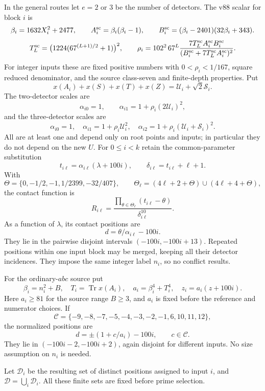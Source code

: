 \documentclass[11pt]{article}
\newcommand{\Tr}{\operatorname{Tr}}
\begin{document}
In the general routes let \(e=2\) or \(3\) be the number of
detectors. The v88 scalar for block \(i\) is
\[
 \beta_i=1632X_i^2+2477,\qquad
 A_i^{\rm sc}=\beta_i(\beta_i-1),\qquad
 B_i^{\rm sc}=(\beta_i-2401)(32\beta_i+343).
\]
\[
 T_L^{\rm sc}=\bigl(1224(67^{(L+1)/2}+1)\bigr)^2,\qquad
 \rho_i=102^2\,67^L
 \frac{7T_L^{\rm sc}A_i^{\rm sc}B_i^{\rm sc}}
 {(B_i^{\rm sc}+7T_L^{\rm sc}A_i^{\rm sc})^2}.
\]
For integer inputs these are fixed positive numbers with
\(0<\rho_i<1/167\), square reduced denominator, and the source
class-seven and finite-depth properties. Put
\[
 x(A_i)+x(S)+x(T)+x(Z)=\mathcal U_i+\sqrt2\mathcal S_i.
\]
The two-detector scales are
\[
           \alpha_{i0}=1,\qquad
           \alpha_{i1}=1+\rho_i(2\mathcal U_i)^2 ,
\]
and the three-detector scales are
\[
 \alpha_{i0}=1,\quad
 \alpha_{i1}=1+\rho_i\mathcal U_i^2,\quad
 \alpha_{i2}=1+\rho_i(\mathcal U_i+\mathcal S_i)^2 .
\]
All are at least one and depend only on root points and inputs;
in particular they do not depend on the new \(U\).
For \(0\le i<k\) retain the common-parameter substitution
\[
 t_{i\ell}=\alpha_{i\ell}(\lambda+100i),\qquad
 \delta_{i\ell}=t_{i\ell}+\ell+1 .
\]
With
\[
 \Theta=\{0,-1/2,-1,1/2399,-32/407\},\qquad
 \Theta_\ell=(4\ell+2+\Theta)\cup(4\ell+4+\Theta),
\]
the contact function is
\begin{equation}\label{eq:R}
 R_{i\ell}=
 \frac{\prod_{\theta\in\Theta_\ell}(t_{i\ell}-\theta)}
      {\delta_{i\ell}^{10}}.
\end{equation}
As a function of \(\lambda\), its contact positions are
\[
             d=\theta/\alpha_{i\ell}-100i.
\]
They lie in the pairwise disjoint intervals
\((-100i,-100i+13)\). Repeated positions within one input block
may be merged, keeping all their detector incidences. They impose
the same integer label \(n_i\), so no conflict results.

For the ordinary-\(abc\) source put
\[
 \beta_i=n_i^2+B,\quad T_i=\Tr x(A_i),\quad
 a_i=\beta_i^4+T_i^4,\quad z_i=a_i(z+100i).
\]
Here \(a_i\ge81\) for the source range \(B\ge3\), and \(a_i\) is
fixed before the reference and numerator choices. If
\[
 \mathcal C=\{-9,-8,-7,-5,-4,-3,-2,-1,6,10,11,12\},
\]
the normalized positions are
\[
                      d=\pm(1+c/a_i)-100i,\qquad c\in\mathcal C.
\]
They lie in \((-100i-2,-100i+2)\), again disjoint for different
inputs. No size assumption on \(n_i\) is needed.

Let \(\mathcal D_i\) be the resulting set of distinct positions
assigned to input \(i\), and \(\mathcal D=\bigcup_i\mathcal D_i\).
All these finite sets are fixed before prime selection.
\end{document}
